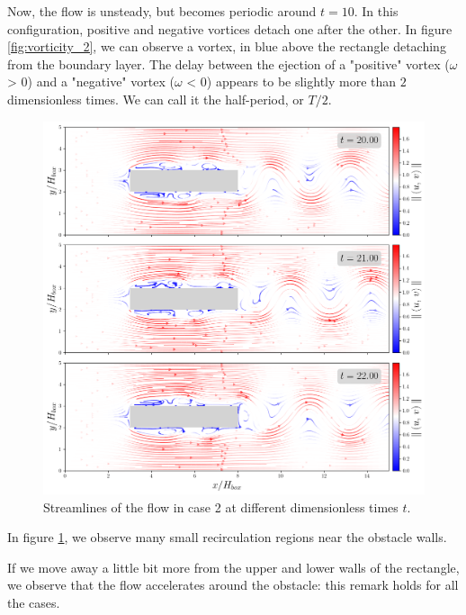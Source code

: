 \documentclass[11 pt]{article}
\begin{document}
Now, the flow is unsteady, but becomes periodic around $t=10$. In this configuration, positive and negative vortices detach one after the other. In figure \ref{fig:vorticity_2}, we can observe a vortex, in blue above the rectangle detaching from the boundary layer. The delay between the ejection of a "positive" vortex ($\omega$ > 0) and a "negative" vortex ($\omega$ < 0) appears to be slightly more than $2$ dimensionless times. We can call it the half-period, or $T/2$.

\begin{figure}[H]
    \centering
    \includegraphics[width=\textwidth]{../figures/streamlines_case_2.png}
    \caption{Streamlines of the flow in case 2 at different dimensionless times $t$. }
    \label{fig:streamlines_2}
\end{figure}

In figure \ref{fig:streamlines_2}, we observe many small recirculation regions near the obstacle walls. 

If we move away a little bit more from the upper and lower walls of the rectangle, we observe that the flow accelerates around the obstacle: this remark holds for all the cases.
\end{document}
